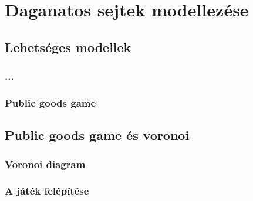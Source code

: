 \section{Daganatos sejtek modellezése}
\subsection{Lehetséges modellek}
\subsubsection{...}
\subsubsection{Public goods game}
\subsection{Public goods game és voronoi}
\subsubsection{Voronoi diagram}
\subsubsection{A játék felépítése}